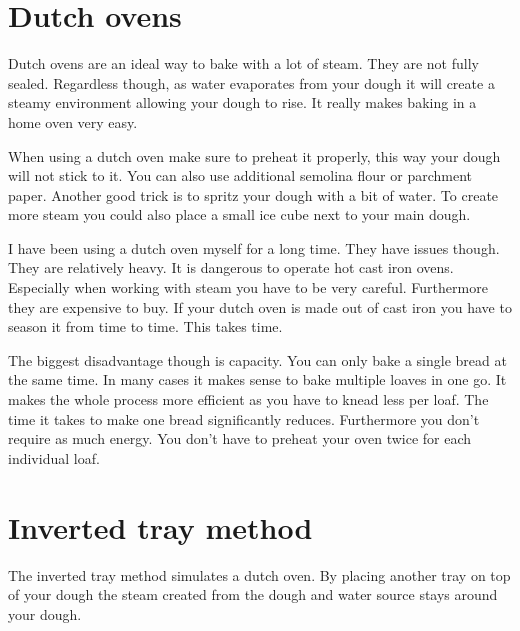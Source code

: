 \section{Dutch ovens}

Dutch ovens are an ideal way to bake with a lot of
steam. They are not fully sealed. Regardless though,
as water evaporates from your dough it will create a steamy
environment allowing your dough to rise. It really
makes baking in a home oven very easy.

When using a dutch oven make sure to preheat it properly,
this way your dough will not stick to it. You can also
use additional semolina flour or parchment paper. Another
good trick is to spritz your dough with a bit of water.
To create more steam you could also place a small ice cube
next to your main dough.

I have been using a dutch oven myself for a long time. They
have issues though. They are relatively heavy. It is dangerous
to operate hot cast iron ovens. Especially when working with steam
you have to be very careful.  Furthermore
they are expensive to buy. If your dutch oven is made out
of cast iron you have to season it from time to time. This takes
time.

The biggest disadvantage though is
capacity. You can only bake a single bread at the
same time. In many cases it makes sense to bake multiple
loaves in one go. It makes the whole process more
efficient as you have to knead less per loaf. The time it
takes to make one bread significantly reduces. Furthermore
you don't require as much energy. You don't have
to preheat your oven twice for each individual loaf.


\section{Inverted tray method}

The inverted tray method simulates a dutch oven.
By placing another tray on top of your dough the steam
created from the dough and water source stays
around your dough.

